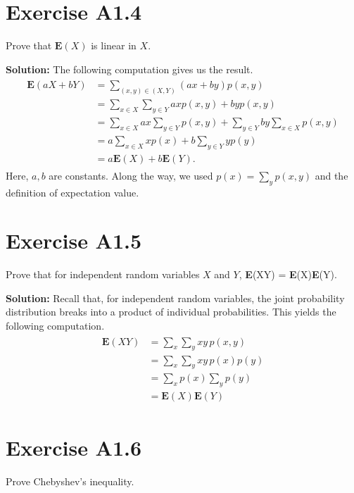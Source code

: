 \documentclass{book}
\begin{document}
\section*{Exercise A1.4} 
    Prove that $\textbf{E}(X)$ is linear in $X$.
    
    \textbf{Solution:} The following computation gives us the result.
    \begin{align}
    \begin{aligned}
        \textbf{E}(aX+bY) &= \sum_{(x,y)\in(X,Y)}(ax+by)p(x,y) \\
        &= \sum_{x\in X}\sum_{y\in Y}axp(x,y) + byp(x,y) \\
        &=\sum_{x\in X}ax\sum_{y\in Y}p(x,y) + \sum_{y\in Y}by\sum_{x\in X}p(x,y) \\
        &=a\sum_{x\in X}x p(x) + b\sum_{y\in Y}yp(y) \\
        &=a\textbf{E}(X) + b\textbf{E}(Y).
    \end{aligned}
    \end{align}
    Here, $a,b$ are constants. Along the way, we used $p(x) = \sum_y p(x,y)$ and the definition of expectation value.

\section*{Exercise A1.5}
    Prove that for independent random variables $X$ and $Y$, \textbf{E}(XY) = \textbf{E}(X)\textbf{E}(Y).
    
    \textbf{Solution:} Recall that, for independent random variables, the joint probability distribution breaks into a product of individual probabilities. This yields the following computation.
    \begin{align}
    \begin{aligned}
        \textbf{E}(XY) &= \sum_x\sum_y xy\,p(x,y)\\
        &= \sum_x\sum_y xy\,p(x)p(y) \\
        &= \sum_x p(x) \sum_y p(y) \\
        &= \textbf{E}(X)\textbf{E}(Y)
    \end{aligned}
    \end{align}

\section*{Exercise A1.6}
    Prove Chebyshev's inequality.
    
\end{document}

